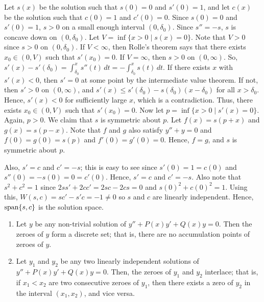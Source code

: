 Let $s(x)$ be the solution such that $s(0) = 0$ and $s'(0) = 1$, and let $c(x)$ be the solution such that $c(0) = 1$ and $c'(0) = 0$. Since $s(0) = 0$ and $s'(0) = 1$, $s > 0$ on a small enough interval $(0,\delta_{0})$. Since $s'' = -s$, $s$ is concave down on $(0,\delta_{0})$. Let $V = \inf\{x > 0 \mid s(x) = 0\}$. Note that $V > 0$ since $s > 0$ on $(0,\delta_{0})$. If $V < \infty$, then Rolle's theorem says that there exists $x_{0} \in (0,V)$ such that $s'(x_{0}) = 0$. If $V = \infty$, then $s > 0$ on $(0,\infty)$. So, $s'(x) - s'(\delta_{0}) = \int_{\delta_{0}}^{x} s''(t) \, dt = -\int_{\delta_{0}}^{x} s(t) \, dt$. If there exists $x$ with $s'(x) < 0$, then $s' = 0$ at some point by the intermediate value theorem. If not, then $s' > 0$ on $(0,\infty)$, and $s'(x) \leq s'(\delta_{0}) - s(\delta_{0})(x-\delta_{0})$ for all $x > \delta_{0}$. Hence, $s'(x) < 0$ for sufficiently large $x$, which is a contradiction. Thus, there exists $x_{0} \in (0,V)$ such that $s'(x_{0}) = 0$. Now let $p = \inf \{x > 0 \mid s'(x) = 0\}$. Again, $p > 0$. We claim that $s$ is symmetric about $p$. Let $f(x) = s(p+x)$ and $g(x) = s(p-x)$. Note that $f$ and $g$ also satisfy $y'' +y = 0$ and $f(0)=g(0)=s(p)$ and $f'(0) = g'(0) = 0$. Hence, $f = g$, and $s$ is symmetric about $p$.

Also, $s' = c$ and $c' = -s$; this is easy to see since $s'(0) = 1 = c(0)$ and $s''(0) = -s(0) = 0 = c'(0)$. Hence, $s' = c$ and $c' = -s$. Also note that $s^{2} + c^{2} = 1$ since $2ss' + 2cc' = 2sc - 2cs = 0$ and $s(0)^{2} + c(0)^{2} = 1$. Using this, $W(s,c) = s c' - s' c = -1 \neq 0$ so $s$ and $c$ are linearly independent. Hence, $\operatorname{span} \{s,c\}$ is the solution space. 

\begin{theorem}
    \begin{enumerate}[label=\arabic*.]
        \item Let $y$ be any non-trivial solution of $y''+P(x)y'+Q(x)y = 0$. Then the zeroes of $y$ form a discrete set; that is, there are no accumulation points of zeroes of $y$.
        \item Let $y_{1}$ and $y_{2}$ be any two linearly independent solutions of $y''+P(x)y'+Q(x)y = 0$. Then, the zeroes of $y_{1}$ and $y_{2}$ interlace; that is, if $x_{1} < x_{2}$ are two consecutive zeroes of $y_{1}$, then there exists a zero of $y_{2}$ in the interval $(x_{1},x_{2})$, and vice versa.
    \end{enumerate}
\end{theorem}

